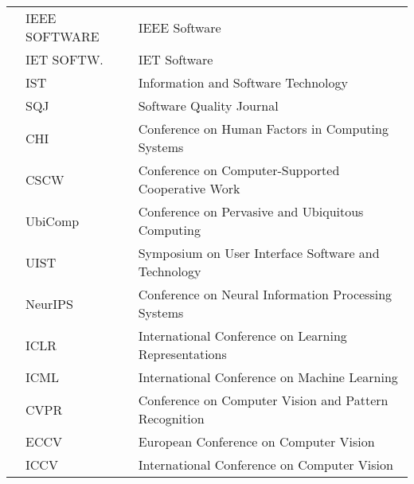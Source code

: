 \begin{table}
{\begin{tabular}{l l p{7.5cm}}
	& IEEE SOFTWARE & IEEE Software                                                                                               \\
	& IET SOFTW.    & IET Software                                                                                                \\
	& IST           & Information and Software Technology                                                                         \\
	& SQJ           & Software Quality Journal                                                                                    \\ 


	\midrule
	
	\multirow{10}{*}{\rotatebox{90}{\textbf{Interdisciplinary Venues}}}
	& CHI       & Conference on Human Factors in Computing Systems  	\\
	& CSCW 		& Conference on Computer-Supported Cooperative Work 	\\
	& UbiComp	& Conference on Pervasive and Ubiquitous Computing 		\\ 
	& UIST      & Symposium on User Interface Software and Technology  	\\

	& NeurIPS   & Conference on Neural Information Processing Systems   \\
	& ICLR		& International Conference on Learning Representations  \\
	& ICML		& International Conference on Machine Learning			\\

	& CVPR    & Conference on Computer Vision and Pattern Recognition   \\
	& ECCV	  & European Conference on Computer Vision					\\
	& ICCV		& International Conference on Computer Vision		\\
	
	\bottomrule

	\end{tabular}
	\label{tbl:paper-sources}
}
\end{table}
